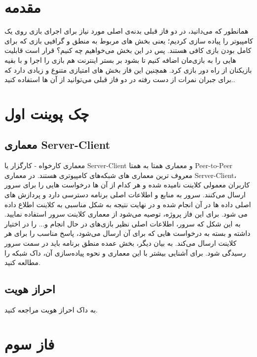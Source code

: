 \documentclass[]{article}
\begin{document}
\newpage

\section*{{\titr مقدمه}}

همانطور که می‌دانید، در دو فاز قبلی بدنه‌ی اصلی مورد نیاز برای اجرای بازی روی یک کامپیوتر را پیاده سازی کردیم؛ یعنی بخش های مربوط به منطق و گرافیی بازی که برای کامل بودن بازی کافی هستند. پس در این بخش می‌خواهیم چه کنیم؟ قرار است قابلیت هایی را به بازی‌مان اضافه کنیم تا بشود بر بستر اینترنت هم بازی را اجرا و با بقیه بازیکنان از راه دور بازی کرد. همچنین این فاز بخش های امتیازی متنوع و زیادی دارد که برای جبران نمرات از دست رفته در دو فاز قبلی می‌توانید از آن ها استفاده کنید..


\section*{{\titr چک پوینت اول}}
\subsection*{{\titr معماری Server-Client}}
معماری کارخواه ‐ کارگزار یا Server-Client و معماری همتا به همتا Peer-to-Peer معروف ترین معماری های شبکه‌های کامپیوتری هستند. در معماری Server-Client، کاربران معمولی کلاینت نامیده شده و هر کدام از آن ها درخواست هایی را برای سرور ارسال می‌کنند. سرور به منابع و اطلاعات اصلی برنامه دسترسی دارد و پردازش های اصلی داده ها در آن انجام شده و در نهایت نتیجه به شکل مناسبی به کلاینت اطلاع داده می شود. برای این فاز پروژه، توصیه می‌شود از معماری کلاینت سرور استفاده نمایید. به این شکل که سرور، اطلاعات اصلی نظیر بازی‌های در حال انجام و... را در اختیار داشته و بسته به درخواست هایی که برای آن ارسال می‌شود، پاسخ مناسب را برای هر کلاینت ارسال می‌کند. به بیان دیگر، بخش عمده منطق برنامه باید در سمت سرور رسیدگی شود. برای آشنایی بیشتر با این معماری و نحوه پیاده‌سازی آن، داک شبکه را مطالعه کنید.

\subsection*{{\titr احراز هویت}}
به داک احراز هویت مراجعه کنید.


\section*{{\titr فاز سوم}}
\end{document}
